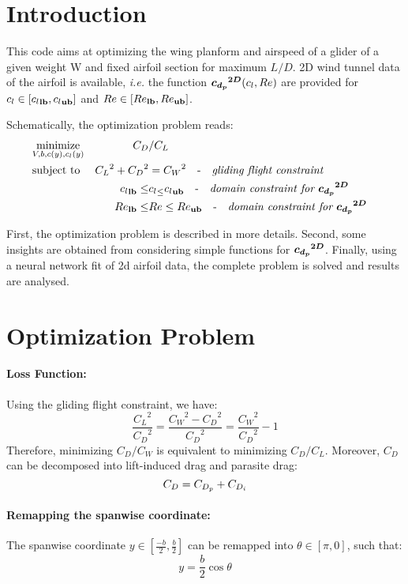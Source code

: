 \documentclass[letterpaper,12pt]{article}
\begin{document}
\section{Introduction}

This code aims at optimizing the wing planform and airspeed of a glider of a given weight W and fixed airfoil section for maximum $L/D$.
2D wind tunnel data of the airfoil is available, {\it i.e.} the function
$\boldsymbol{{c_{d_p}}^{2D}}(c_l, Re)$ are provided for  $c_l \in [{c_l}_{\bf lb}, {c_l}_{\bf ub}]$   and $Re \in [{Re}_{\bf lb}, {Re}_{\bf ub}]$.

Schematically, the optimization problem reads:
\begin{align*}
	& \underset{V, b, c(y), c_l(y)}{\text{minimize}} &  C_D &/ C_L  & \\
	& \text{subject to} 
	&  {C_L}^2 + {C_D}^2 &= {C_W}^2 \quad \text{-} \quad \text{\it gliding flight constraint} \\
	& & {c_l}_{\bf lb} \leq &{c_l}_{\bf \leq} {c_l}_{\bf ub} \quad \text{-} \quad \text{\it domain constraint for } \boldsymbol{{c_{d_p}}^{2D}}  \\
	& & {Re}_{\bf lb} \leq &{Re} \leq {Re}_{\bf ub} \quad \text{-} \quad \text{\it domain constraint for } \boldsymbol{{c_{d_p}}^{2D}}
\end{align*}

First, the optimization problem is described in more details. 
Second, some insights are obtained from considering simple functions for $\boldsymbol{{c_{d_p}}^{2D}}$.
Finally, using a neural network fit of 2d airfoil data, the complete problem is solved and results are analysed.


\section{Optimization Problem}

\paragraph{Loss Function:}Using the gliding flight constraint, we have:
$$ \frac{{C_L}^2}{{C_D}^2} = \frac{{C_W}^2 - {C_D}^2}{{C_D}^2} = \frac{{C_W}^2}{{C_D}^2} - 1$$
Therefore, minimizing $C_{D} / C_W$  is equivalent to minimizing $C_{D} / C_L$.
Moreover, $C_D$ can be decomposed into lift-induced drag and parasite drag:
$$C_D = C_{D_p} + C_{D_i}$$

\paragraph{Remapping the spanwise coordinate:} The spanwise coordinate $y \in [\frac {-b} 2, \frac b 2]$ can be remapped into $\theta \in [\pi, 0]$, such that:
$$y = \frac b 2 \cos\theta$$
\end{document}
